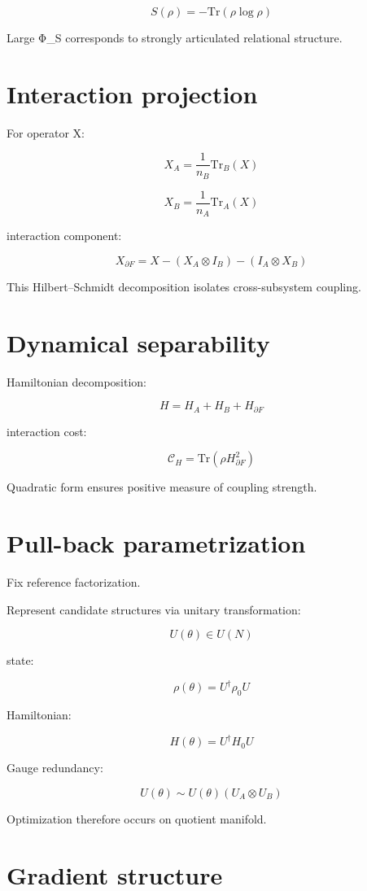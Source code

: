 \documentclass[11pt]{article}
\begin{document}
\[
S(\rho)
=
-\mathrm{Tr}(\rho\log\rho)
\]

Large Φ_S corresponds to strongly articulated relational structure.

\section{Interaction projection}

For operator X:

\[
X_A
=
\frac{1}{n_B}\mathrm{Tr}_B(X)
\]

\[
X_B
=
\frac{1}{n_A}\mathrm{Tr}_A(X)
\]

interaction component:

\[
X_{\partial F}
=
X
-
(X_A\otimes I_B)
-
(I_A\otimes X_B)
\]

This Hilbert–Schmidt decomposition isolates cross-subsystem coupling.

\section{Dynamical separability}

Hamiltonian decomposition:

\[
H=H_A+H_B+H_{\partial F}
\]

interaction cost:

\[
\mathcal C_H
=
\mathrm{Tr}(\rho H_{\partial F}^2)
\]

Quadratic form ensures positive measure of coupling strength.

\section{Pull-back parametrization}

Fix reference factorization.

Represent candidate structures via unitary transformation:

\[
U(\theta)\in U(N)
\]

state:

\[
\rho(\theta)
=
U^\dagger\rho_0U
\]

Hamiltonian:

\[
H(\theta)
=
U^\dagger H_0 U
\]

Gauge redundancy:

\[
U(\theta)
\sim
U(\theta)(U_A\otimes U_B)
\]

Optimization therefore occurs on quotient manifold.

\section{Gradient structure}
\end{document}
